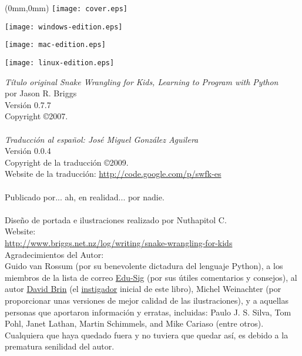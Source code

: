 \pagestyle{empty}
\frontmatter
\begin{FRONTCOVER}
\begin{titlepage}
\begin{textblock*}{210mm}(0mm,0mm)
   \texttt{[image: cover.eps]}
\end{textblock*}
\begin{flushleft}
\begin{WINDOWS}
\texttt{[image: windows-edition.eps]} 
\end{WINDOWS}
\begin{MAC}
\texttt{[image: mac-edition.eps]} 
\end{MAC}
\begin{LINUX}
\texttt{[image: linux-edition.eps]} 
\end{LINUX}
\end{flushleft}
\end{titlepage}
\end{FRONTCOVER}

\noindent
\textsf{\emph{Título original Snake Wrangling for Kids, Learning to Program with Python}}\\
por Jason R. Briggs\\
Versión 0.7.7
\\
Copyright \copyright 2007.\\
\\
\textsf{\emph{Traducción al español: José Miguel González Aguilera}}\\
Versión 0.0.4
\\
Copyright de la traducción \copyright 2009.\\
Website de la traducción: \href{http://code.google.com/p/swfk-es}{http://code.google.com/p/swfk-es}\\
\\
Publicado por... ah, en realidad... por nadie.\\
\\
Diseño de portada e ilustraciones realizado por Nuthapitol C.\\
\linebreak 
\noindent
Website:\\ \href{http://www.briggs.net.nz/log/writing/snake-wrangling-for-kids}{http://www.briggs.net.nz/log/writing/snake-wrangling-for-kids}\\ 

\noindent
Agradecimientos del Autor:\\
Guido van Rossum (por su benevolente dictadura del lenguaje Python), a los miembros de la lista de correo \href{http://www.python.org/community/sigs/current/edu-sig/}{Edu-Sig} (por sus útiles comentarios y consejos), al autor \href{http://www.davidbrin.com/}{David Brin} (el \href{http://www.salon.com/tech/feature/2006/09/14/basic/}{instigador} inicial de este libro), Michel Weinachter (por proporcionar unas versiones de mejor calidad de las ilustraciones), y a aquellas personas que aportaron información y erratas, incluidas: Paulo J. S. Silva, Tom Pohl, Janet Lathan, Martin Schimmels, and Mike Cariaso (entre otros).  Cualquiera que haya quedado fuera y no tuviera que quedar así, es debido a la prematura senilidad del autor.\\

